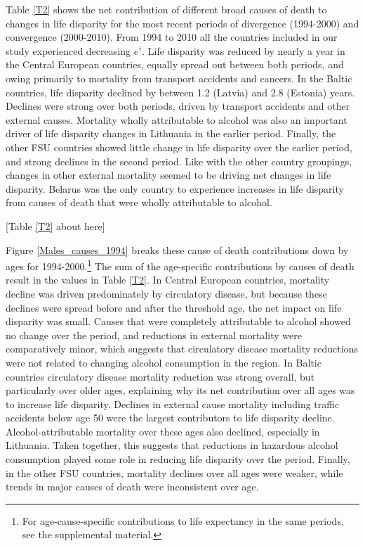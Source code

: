 \documentclass{article}
\begin{document}
\begin{spacing}{1.5}
Table \ref{T2} shows the net contribution of different broad causes of death to changes in life disparity for the most recent periods of divergence (1994-2000) and convergence (2000-2010). From 1994 to 2010 all the countries included in our study experienced decreasing $e^\dagger$. Life disparity was reduced by nearly a year in the Central European countries, equally spread out between both periods, and owing primarily to mortality from transport accidents and cancers. In the Baltic countries, life disparity declined by between 1.2 (Latvia) and 2.8 (Estonia) years. Declines were strong over both periods, driven by transport accidents and other external causes. Mortality wholly attributable to alcohol was also an important driver of life disparity changes in Lithuania in the earlier period. Finally, the other FSU countries showed little change in life disparity over the earlier period, and strong declines in the second period. Like with the other country groupings, changes in other external mortality seemed to be driving net changes in life disparity. Belarus was the only country to experience increases in life disparity from causes of death that were wholly attributable to alcohol. \\


\begin{center}
[Table  \ref{T2} about here]\\
\end{center}


Figure \ref{Males_causes_1994} breaks these cause of death contributions down by ages for 1994-2000.\footnote{For age-cause-specific contributions to life expectancy in the same periods, see the supplemental material.} The sum of the age-specific contributions by causes of death result in the values in Table \ref{T2}. In Central European countries, mortality decline was driven predominately by circulatory disease, but because these declines were spread before and after the threshold age, the net impact on life disparity was small. Causes that were completely attributable to alcohol showed no change over the period, and reductions in external mortality were comparatively minor, which suggests that circulatory disease mortality reductions were not related to changing alcohol consumption in the region. In Baltic countries circulatory disease mortality reduction was strong overall, but particularly over older ages, explaining why its net contribution over all ages was to increase life disparity. Declines in external cause mortality including traffic accidents below age 50 were the largest contributors to life disparity decline. Alcohol-attributable mortality over these ages also declined, especially in Lithuania. Taken together, this suggests that reductions in hazardous alcohol consumption played some role in reducing life disparity over the period. Finally, in the other FSU countries, mortality declines over all ages were weaker, while trends in major causes of death were inconsistent over age. \\


\end{spacing}
\end{document}
